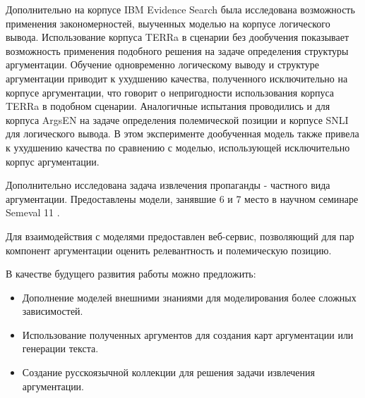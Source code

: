 Дополнительно на корпусе IBM Evidence Search была исследована возможность применения закономерностей, выученных моделью на корпусе логического вывода. Использование корпуса TERRa в сценарии без дообучения показывает возможность применения подобного решения на задаче определения структуры аргументации. Обучение одновременно логическому выводу и структуре аргументации приводит к ухудшению качества, полученного исключительно на корпусе аргументации, что говорит о непригодности использования корпуса TERRa в подобном сценарии. Аналогичные испытания проводились и для корпуса ArgsEN на задаче определения полемической позиции и корпусе SNLI для логического вывода. В этом эксперименте дообученная модель также привела к ухудшению качества по сравнению с моделью, использующей исключительно корпус аргументации.

Дополнительно исследована задача извлечения пропаганды - частного вида аргументации. Предоставлены модели, занявшие 6 и 7 место в научном семинаре Semeval 11 \cite{dimov-etal-2020-nopropaganda}.

Для взаимодействия с моделями предоставлен веб-сервис, позволяющий для пар компонент аргументации оценить релевантность и полемическую позицию.

В качестве будущего развития работы можно предложить:
\begin{itemize}
    \item Дополнение моделей внешними знаниями для моделирования более сложных зависимостей.
    \item Использование полученных аргументов для создания карт аргументации или генерации текста.
    \item Создание русскоязычной коллекции для решения задачи извлечения аргументации.
\end{itemize}